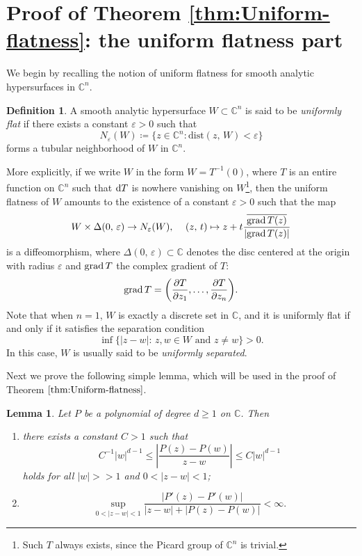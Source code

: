 \documentclass[12pt,a4paper]{amsart}
\numberwithin{equation}{section}
\newtheorem{lemma}[theorem]{Lemma}
\theoremstyle{definition}
\newtheorem{definition}{Definition}
\begin{document}
\bigskip

\section{Proof of Theorem \ref{thm:Uniform-flatness}: the uniform flatness part}\label{sect: Uniform-flatness}
We begin by recalling the notion of uniform flatness for smooth analytic hypersurfaces in $\mathbb C^n$.

\begin{definition}
A smooth analytic hypersurface $W\subset \mathbb C^n$ is said to be {\it uniformly flat} if there exists a constant $\varepsilon>0$ such that
  $$
  N_{\varepsilon}(W) \coloneqq \big\{ z\in \mathbb C^n \!: \mbox{dist}(z,\, W)<\varepsilon \big\}
  $$
forms a tubular neighborhood of $W$ in $\mathbb C^n$.
\end{definition}

More explicitly, if we write $W$ in the form $W=T^{-1}(0)$, where $T$ is an entire function on $\mathbb C^n$ such that ${\rm d}T$ is nowhere vanishing on $W$\footnote{Such $T$ always exists, since the Picard group of $\mathbb C^n$ is trivial.}, then the uniform flatness of $W$ amounts to the existence of a constant $\varepsilon>0$ such that the map
  $$
  W\times \Delta(0,\, \varepsilon) \to N_{\varepsilon}(W), \quad \, (z,\, t)\mapsto z+t \frac{\overline{{\rm grad}\, T(z)}}{|{\rm grad}\, T(z)|}
  $$
is a diffeomorphism, where $\Delta(0,\, \varepsilon)\subset \mathbb C$ denotes the disc centered at the origin with radius $\varepsilon$ and ${\rm grad}\, T$ the complex gradient of $T$:
   $$
   {\rm grad}\, T=\bigg(\frac{\partial T}{\partial z_1},\ldots, \frac{\partial T}{\partial z_n}\bigg).
   $$
Note that when $n=1$, $W$ is exactly a discrete set in $\mathbb C$, and it is uniformly flat if and only if it satisfies the separation condition
   $$
   \inf\!\big\{|z-w|\!: \, z, w\in W \,\, \mbox{and}\,\, z\neq w\big\}>0.
   $$
In this case, $W$ is usually said to be {\it uniformly separated}.

\smallskip

Next we prove the following simple lemma, which will be used in the proof of Theorem $\ref{thm:Uniform-flatness}$.
\begin{lemma}\label{Lem: polynomial}
  Let $P$ be a polynomial of degree $d\geq 1$ on $\mathbb C$. Then
  \begin{enumerate}[leftmargin=2.0pc, parsep=4pt]
   \item [{\rm(i)}] there exists a constant $C>1$ such that
         $$
         C^{-1}|w|^{d-1} \leq \left|\frac{P(z)-P(w)}{z-w}\right| \leq C|w|^{d-1}
         $$
      holds for all  $|w|>>1$ and $0<|z-w|<1$;

   \item [{\rm(ii)}]
         $$
         \sup\limits_{0<|z-w|<1}\frac{|P'(z)-P'(w)|}{|z-w|+|P(z)-P(w)|}<\infty.
         $$
  \end{enumerate}
\end{lemma}
\end{document}
